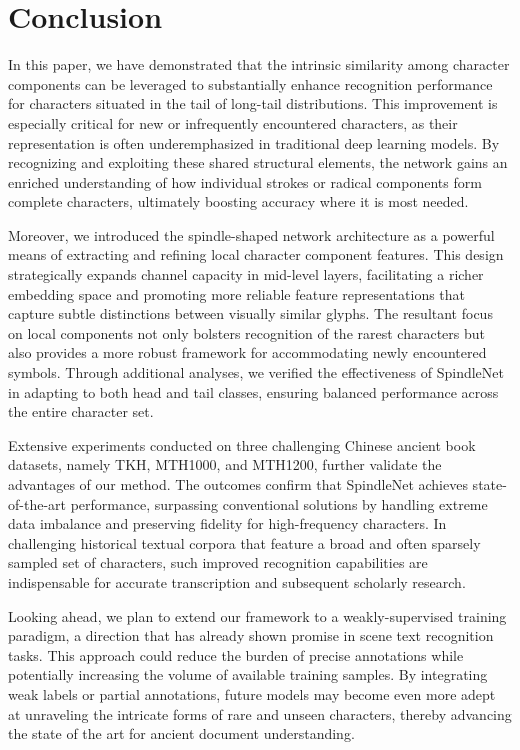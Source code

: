 \section{Conclusion}

In this paper, we have demonstrated that the intrinsic similarity among character components can be leveraged to substantially enhance recognition performance for characters situated in the tail of long-tail distributions. This improvement is especially critical for new or infrequently encountered characters, as their representation is often underemphasized in traditional deep learning models. By recognizing and exploiting these shared structural elements, the network gains an enriched understanding of how individual strokes or radical components form complete characters, ultimately boosting accuracy where it is most needed.

Moreover, we introduced the spindle-shaped network architecture as a powerful means of extracting and refining local character component features. This design strategically expands channel capacity in mid-level layers, facilitating a richer embedding space and promoting more reliable feature representations that capture subtle distinctions between visually similar glyphs. The resultant focus on local components not only bolsters recognition of the rarest characters but also provides a more robust framework for accommodating newly encountered symbols. Through additional analyses, we verified the effectiveness of SpindleNet in adapting to both head and tail classes, ensuring balanced performance across the entire character set.

Extensive experiments conducted on three challenging Chinese ancient book datasets, namely TKH, MTH1000, and MTH1200, further validate the advantages of our method. The outcomes confirm that SpindleNet achieves state-of-the-art performance, surpassing conventional solutions by handling extreme data imbalance and preserving fidelity for high-frequency characters. In challenging historical textual corpora that feature a broad and often sparsely sampled set of characters, such improved recognition capabilities are indispensable for accurate transcription and subsequent scholarly research.

Looking ahead, we plan to extend our framework to a weakly-supervised training paradigm, a direction that has already shown promise in scene text recognition tasks. This approach could reduce the burden of precise annotations while potentially increasing the volume of available training samples. By integrating weak labels or partial annotations, future models may become even more adept at unraveling the intricate forms of rare and unseen characters, thereby advancing the state of the art for ancient document understanding.
